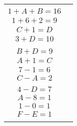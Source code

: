 \documentclass[a4paper,12pt]{article}
\begin{document}
	\vspace{2em} 
	
	\begin{center}
		\begin{tabular}{cc}
			\begin{minipage}{0.48\linewidth}
				\begin{enumerate}[label=\alph*)]
					\item $3+F = 12$ \\ $1+A+B=16$ \\ $1+6+2=9$	
				\end{enumerate}
			\end{minipage}
			&
			\begin{minipage}{0.48\linewidth}
				\begin{enumerate}[start=2,label=\alph*)]
					\item $5+A=F$ \\ $C+1=D$ \\ $3+D=10$
				\end{enumerate}
			\end{minipage}
			\\[3em]
			\begin{minipage}{0.48\linewidth}
				\begin{enumerate}[start=3,label=\alph*)]
					\item $C+E=A$ \\ $B+D=9$ \\ $A+1=C$
				\end{enumerate}
			\end{minipage}
			&
			\begin{minipage}{0.48\linewidth}
				\begin{enumerate}[start=4,label=\alph*)]
					\item $19-B=E$ \\ $7-1=6$ \\ $C-A=2$
				\end{enumerate}
			\end{minipage}
			\\[3em]
			\begin{minipage}{0.48\linewidth}
				\begin{enumerate}[start=5,label=\alph*)]
					\item $F-2=D$ \\ $4-D=7$ \\ $A-8=1$
				\end{enumerate}
			\end{minipage}
			&
			\begin{minipage}{0.48\linewidth}
				\begin{enumerate}[start=6,label=\alph*)]
					\item $11-9=7$ \\ $1-0=1$ \\ $F-E=1$ \\
				\end{enumerate}
			\end{minipage}
		\end{tabular}
	\end{center} 
	
\end{document}
